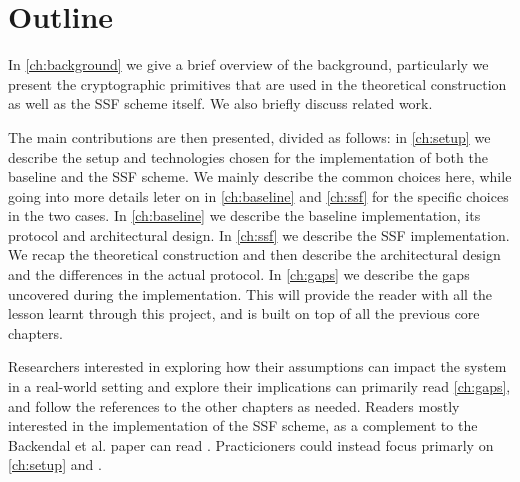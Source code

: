 \section{Outline}

In \cref{ch:background} we give a brief overview of the background, particularly 
we present the cryptographic primitives that are used in the theoretical construction 
as well as the SSF scheme itself. We also briefly discuss related work. 

The main contributions are then presented, divided as follows: 
in \cref{ch:setup} we describe the setup and technologies chosen for the implementation of both the baseline and the SSF scheme. We mainly describe the common choices here, while going into more details leter on in \cref{ch:baseline} and \cref{ch:ssf} for the specific choices in the two cases.
In \cref{ch:baseline} we describe the baseline implementation, its protocol and architectural design.
In \cref{ch:ssf} we describe the SSF implementation. We recap the theoretical construction and then describe the architectural design and the differences in the actual protocol.
In \cref{ch:gaps} we describe the gaps uncovered during the implementation. This will provide the reader with all the lesson learnt through this project, and is built on top of all the previous core chapters.

Researchers interested in exploring how their assumptions can impact the system in a real-world setting and explore their implications can primarily read \cref{ch:gaps}, and follow the references to the other chapters as needed.
Readers mostly interested in the implementation of the SSF scheme, as a complement to the Backendal et al. paper can read .
Practicioners could instead focus primarly on \cref{ch:setup} and .
